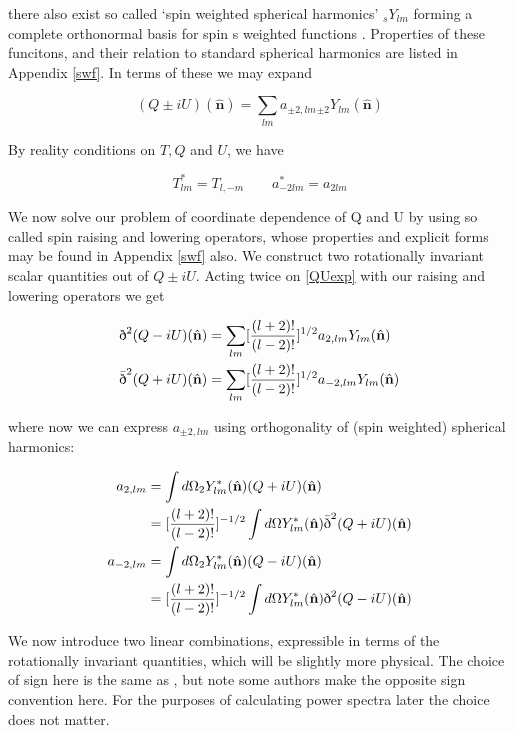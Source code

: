 \documentclass[a4paper,10pt]{article}
\renewcommand{\v}[1]{\mathbf{#1}}
\newcommand{\unit}[1]{\hat{\v{#1}}}
\newcommand{\sr}{\text{\normalfont\dh}}
\renewcommand{\sl}{\bar{\text{\normalfont\dh}}}
\newcommand{\ltwo}{[\frac{(l+2)!}{(l-2)!}]}
\begin{document}
there also exist so called `spin weighted spherical harmonics' $_sY_{lm}$ forming a complete orthonormal basis for spin s weighted functions \cite{all-sky}. Properties of these funcitons, and their relation to standard spherical harmonics are listed in Appendix \ref{swf}. In terms of these we may expand

\begin{equation}
(Q\pm iU)(\unit{n}) = \sum_{lm} a_{\pm2,lm} {}_{\pm2}Y_{lm}(\unit{n})
\label{QUexp}
\end{equation}

By reality conditions on $T, Q$ and $U$, we have

\begin{equation}
T_{lm}^* = T_{l,-m} \qquad a_{-2lm}^*=a_{2lm}
\end{equation}

We now solve our problem of coordinate dependence of Q and U by using so called spin raising and lowering operators, whose properties and explicit forms may be found in Appendix \ref{swf} also. We construct two rotationally invariant scalar quantities out of $Q\pm iU$. Acting twice on \ref{QUexp} with our raising and lowering operators we get

\begin{equation}\begin{split}
\sr^2(Q-iU)(\unit{n}) &= \sum_{lm} \ltwo^{1/2} a_{2,lm} {}Y_{lm}(\unit{n})\\
\sl^2(Q+iU)(\unit{n}) &= \sum_{lm} \ltwo^{1/2} a_{-2,lm} {}Y_{lm}(\unit{n})
\end{split}\end{equation}

where now we can express $a_{\pm2,lm}$ using orthogonality of (spin weighted) spherical harmonics:


\begin{equation}\begin{split}
a_{2,lm} &= \int d\Omega {}_2Y_{lm}^*(\unit{n})(Q+iU)(\unit{n})\\
&= \ltwo^{-1/2}\int d\Omega Y_{lm}^*(\unit{n})\sl^2(Q+iU)(\unit{n})\\
a_{-2,lm} &= \int d\Omega {}_2Y_{lm}^*(\unit{n})(Q-iU)(\unit{n})\\
&= \ltwo^{-1/2}\int d\Omega Y_{lm}^*(\unit{n})\sr^2(Q-iU)(\unit{n})
\end{split}\end{equation}

We now introduce two linear combinations, expressible in terms of the rotationally invariant quantities, which will be slightly more physical. The choice of sign here is the same as \cite{all-sky}, but note some authors make the opposite sign convention here. For the purposes of calculating power spectra later the choice does not matter.
\end{document}
